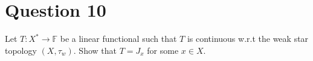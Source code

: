 \section{Question 10}
\horz

Let $T: X^* \to \mathbb F$ be a linear functional such that $T$ is continuous w.r.t the weak star topology $(X,\tau_w).$ Show that $T= J_x$ for some $x\in X.$ 

\horz
